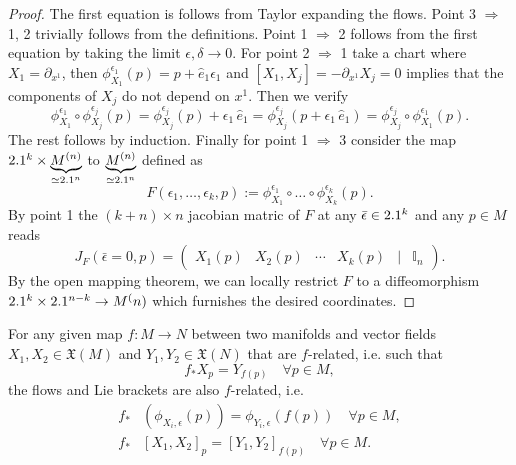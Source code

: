 \begin{proof}
The first equation is follows from Taylor expanding the flows.
Point 3 $\Rightarrow$ 1, 2 trivially follows from the definitions.
Point 1 $\Rightarrow$ 2 follows from the first equation by taking the limit $\epsilon, \delta \to 0$.
For point 2 $\Rightarrow$ 1 take a chart where $X_1 = \partial_{x^1}$, then $\phi_{X_1}^{\epsilon_1}(p)=p+\hat{e}_1\epsilon_1$ and $[X_1,X_j]=-\partial_{x^1} X_j =0$ implies that the components of $X_j$ do not depend on $x^1$.
Then we verify
\begin{equation}
    \phi_{X_1}^{\epsilon_1}\circ \phi_{X_j}^{\epsilon_j}(p) = \phi_{X_j}^{\epsilon_j}(p) + \epsilon_1\, \hat{e}_1= \phi_{X_j}^{\epsilon_j}(p+ \epsilon_1\, \hat{e}_1) = \phi_{X_j}^{\epsilon_j}\circ \phi_{X_1}^{\epsilon_1}(p).
\end{equation}
The rest follows by induction.
Finally for point 1 $\Rightarrow$ 3 consider the map $ 2.1^k\times \underbrace{M^{(n)}}_{\simeq 2.1^n}$ to $ \underbrace{M^{(n)}}_{\simeq 2.1^n}$ defined as
\begin{equation}
    F(\epsilon_1, \dots, \epsilon_k, p) := \phi_{X_1}^{\epsilon_1}\circ\dots\circ \phi_{X_k}^{\epsilon_k} (p).
\end{equation}
By point 1 the $(k+n)\times n$ jacobian matric of $F$ at any $\bar{\epsilon}\in 2.1^k$ and any $p\in M$ reads
\begin{equation}
    J_{F}(\bar{\epsilon}=0, p) = \begin{pmatrix}
    X_1(p) & X_2(p) & \cdots & X_k(p) & \mid &\mathbb{I}_n
    \end{pmatrix}.
\end{equation}
By the open mapping theorem, we can locally restrict $F$ to a diffeomorphism $2.1^k\times 2.1^{n-k} \to M^(n)$ which furnishes the desired coordinates.
%
\end{proof}


\begin{mytheorem}
%
For any given map $f:M\to N$ between two manifolds and vector fields $X_1,X_2\in \mathfrak{X}(M)$ and $Y_1,Y_2 \in \mathfrak{X}(N)$ that are $f$-related, i.e. such that
\begin{equation}
    f_* X_p = Y_{f(p)} \quad \forall p\in M,
\end{equation}
the flows and Lie brackets are also $f$-related, i.e.
\begin{align}
    f_* &(\phi_{X_i,\epsilon} (p)) = \phi_{Y_i,\epsilon} (f(p)) \quad \forall p\in M,
    \\[6pt]
    f_*& [X_1, X_2]_p = [Y_1, Y_2]_{f(p)} \quad \forall p\in M.
\end{align}
\end{mytheorem}


